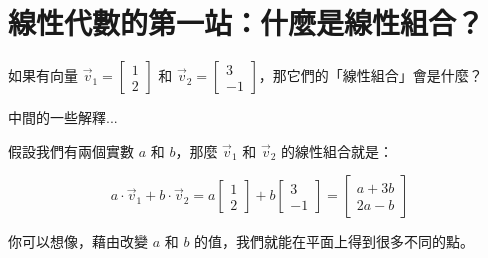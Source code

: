 \documentclass{article}
\begin{document}
\section*{線性代數的第一站：什麼是線性組合？}

\vspace{-2cm}

\vspace{-2cm}


\begin{textRight}\begin{readerSaid}
如果有向量 $\vec{v}_1 = \begin{bmatrix}1 \\ 2\end{bmatrix}$ 和 $\vec{v}_2 = \begin{bmatrix}3 \\ -1\end{bmatrix}$，那它們的「線性組合」會是什麼？
\end{readerSaid}\end{textRight}

\begin{center}
中間的一些解釋...
\end{center}

\begin{textLeft}\begin{teacherSaid}
假設我們有兩個實數 $a$ 和 $b$，那麼 $\vec{v}_1$ 和 $\vec{v}_2$ 的線性組合就是：

\[
a \cdot \vec{v}_1 + b \cdot \vec{v}_2 = a \begin{bmatrix}1 \\ 2\end{bmatrix} + b \begin{bmatrix}3 \\ -1\end{bmatrix} = \begin{bmatrix}a + 3b \\ 2a - b\end{bmatrix}
\]

你可以想像，藉由改變 $a$ 和 $b$ 的值，我們就能在平面上得到很多不同的點。
\end{teacherSaid}\end{textLeft}


\vspace{-4cm}
\end{document}
